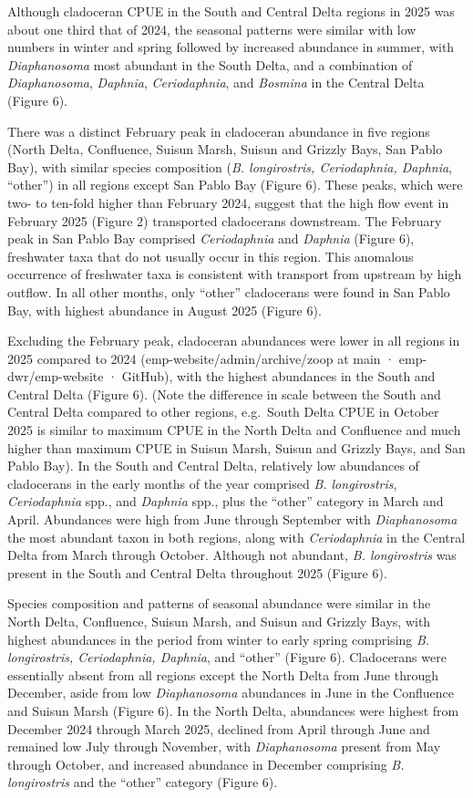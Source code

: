 \documentclass[
  letterpaper,
]{article}
\begin{document}
Although cladoceran CPUE in the South and Central Delta regions in 2025
was about one third that of 2024, the seasonal patterns were similar
with low numbers in winter and spring followed by increased abundance in
summer, with \emph{Diaphanosoma} most abundant in the South Delta, and a
combination of \emph{Diaphanosoma}, \emph{Daphnia}, \emph{Ceriodaphnia},
and \emph{Bosmina} in the Central Delta (Figure 6).

There was a distinct February peak in cladoceran abundance in five
regions (North Delta, Confluence, Suisun Marsh, Suisun and Grizzly Bays,
San Pablo Bay), with similar species composition (\emph{B. longirostris,
Ceriodaphnia, Daphnia}, ``other'') in all regions except San Pablo Bay
(Figure 6). These peaks, which were two- to ten-fold higher than
February 2024, suggest that the high flow event in February 2025 (Figure
2) transported cladocerans downstream. The February peak in San Pablo
Bay comprised \emph{Ceriodaphnia} and \emph{Daphnia} (Figure 6),
freshwater taxa that do not usually occur in this region. This anomalous
occurrence of freshwater taxa is consistent with transport from upstream
by high outflow. In all other months, only ``other'' cladocerans were
found in San Pablo Bay, with highest abundance in August 2025 (Figure
6).

Excluding the February peak, cladoceran abundances were lower in all
regions in 2025 compared to 2024 (emp-website/admin/archive/zoop at main
· emp-dwr/emp-website · GitHub), with the highest abundances in the
South and Central Delta (Figure 6). (Note the difference in scale
between the South and Central Delta compared to other regions,
e.g.~South Delta CPUE in October 2025 is similar to maximum CPUE in the
North Delta and Confluence and much higher than maximum CPUE in Suisun
Marsh, Suisun and Grizzly Bays, and San Pablo Bay). In the South and
Central Delta, relatively low abundances of cladocerans in the early
months of the year comprised \emph{B. longirostris}, \emph{Ceriodaphnia}
spp., and \emph{Daphnia} spp., plus the ``other'' category in March and
April. Abundances were high from June through September with
\emph{Diaphanosoma} the most abundant taxon in both regions, along with
\emph{Ceriodaphnia} in the Central Delta from March through October.
Although not abundant, \emph{B. longirostris} was present in the South
and Central Delta throughout 2025 (Figure 6).

Species composition and patterns of seasonal abundance were similar in
the North Delta, Confluence, Suisun Marsh, and Suisun and Grizzly Bays,
with highest abundances in the period from winter to early spring
comprising \emph{B. longirostris, Ceriodaphnia, Daphnia}, and ``other''
(Figure 6). Cladocerans were essentially absent from all regions except
the North Delta from June through December, aside from low
\emph{Diaphanosoma} abundances in June in the Confluence and Suisun
Marsh (Figure 6). In the North Delta, abundances were highest from
December 2024 through March 2025, declined from April through June and
remained low July through November, with \emph{Diaphanosoma} present
from May through October, and increased abundance in December comprising
\emph{B. longirostris} and the ``other'' category (Figure 6).
\end{document}
